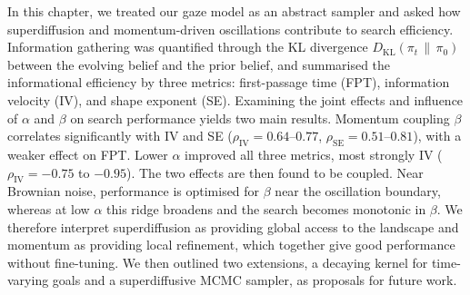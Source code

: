 In this chapter, we treated our gaze model as an abstract sampler and asked how superdiffusion and momentum-driven oscillations contribute to search efficiency. Information gathering was quantified through the KL divergence $D_{\mathrm{KL}}(\pi_t \,\|\, \pi_0)$ between the evolving belief and the prior belief, and summarised the informational efficiency by three metrics: first-passage time (FPT), information velocity (IV), and shape exponent (SE). Examining the joint effects and influence of $\alpha$ and $\beta$ on search performance yields two main results. Momentum coupling $\beta$ correlates significantly with IV and SE ($\rho_{\mathrm{IV}} = 0.64$--$0.77$, $\rho_{\mathrm{SE}} = 0.51$--$0.81$), with a weaker effect on FPT. Lower $\alpha$ improved all three metrics, most strongly IV ($\rho_{\mathrm{IV}} = -0.75$ to $-0.95$). The two effects are then found to be coupled. Near Brownian noise, performance is optimised for $\beta$ near the oscillation boundary, whereas at low $\alpha$ this ridge broadens and the search becomes monotonic in $\beta$. We therefore interpret superdiffusion as providing global access to the landscape and momentum as providing local refinement, which together give good performance without fine-tuning. We then outlined two extensions, a decaying kernel for time-varying goals and a superdiffusive MCMC sampler, as proposals for future work.
